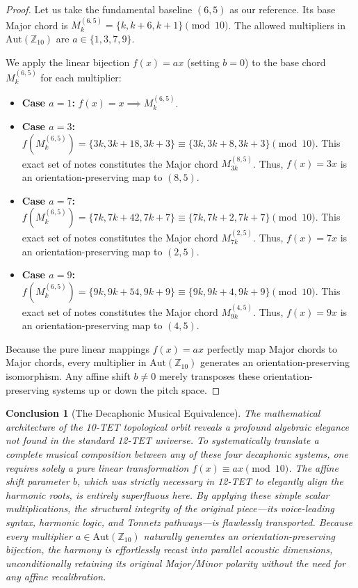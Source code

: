 \documentclass[11pt,letterpaper]{amsart}
\newcommand{\Z}{\mathbb{Z}}
\newtheorem{conclusion}{Conclusion}
\begin{document}
\begin{proof}
Let us take the fundamental baseline $(6,5)$ as our reference. Its base Major chord is $M_k^{(6,5)} = \{k, k+6, k+1\} \pmod{10}$. The allowed multipliers in $\mathrm{Aut}(\Z_{10})$ are $a \in \{1, 3, 7, 9\}$. 

We apply the linear bijection $f(x) = ax$ (setting $b=0$) to the base chord $M_k^{(6,5)}$ for each multiplier:
\begin{itemize}
    \item \textbf{Case $a = 1$:} $f(x) = x \implies M_k^{(6,5)}$.
    \item \textbf{Case $a = 3$:} $f(M_k^{(6,5)}) = \{3k, 3k+18, 3k+3\} \equiv \{3k, 3k+8, 3k+3\} \pmod{10}$. This exact set of notes constitutes the Major chord $M_{3k}^{(8,5)}$. Thus, $f(x)=3x$ is an orientation-preserving map to $(8,5)$.
    \item \textbf{Case $a = 7$:} $f(M_k^{(6,5)}) = \{7k, 7k+42, 7k+7\} \equiv \{7k, 7k+2, 7k+7\} \pmod{10}$. This exact set of notes constitutes the Major chord $M_{7k}^{(2,5)}$. Thus, $f(x)=7x$ is an orientation-preserving map to $(2,5)$.
    \item \textbf{Case $a = 9$:} $f(M_k^{(6,5)}) = \{9k, 9k+54, 9k+9\} \equiv \{9k, 9k+4, 9k+9\} \pmod{10}$. This exact set of notes constitutes the Major chord $M_{9k}^{(4,5)}$. Thus, $f(x)=9x$ is an orientation-preserving map to $(4,5)$.
\end{itemize}
Because the pure linear mappings $f(x) = ax$ perfectly map Major chords to Major chords, every multiplier in $\mathrm{Aut}(\Z_{10})$ generates an orientation-preserving isomorphism. Any affine shift $b \neq 0$ merely transposes these orientation-preserving systems up or down the pitch space.
\end{proof}

\begin{conclusion}[The Decaphonic Musical Equivalence]
The mathematical architecture of the 10-TET topological orbit reveals a profound algebraic elegance not found in the standard 12-TET universe. To systematically translate a complete musical composition between any of these four decaphonic systems, one requires solely a pure linear transformation $f(x) \equiv ax \pmod{10}$. The affine shift parameter $b$, which was strictly necessary in 12-TET to elegantly align the harmonic roots, is entirely superfluous here. By applying these simple scalar multiplications, the structural integrity of the original piece---its voice-leading syntax, harmonic logic, and Tonnetz pathways---is flawlessly transported. Because every multiplier $a \in \mathrm{Aut}(\Z_{10})$ naturally generates an orientation-preserving bijection, the harmony is effortlessly recast into parallel acoustic dimensions, unconditionally retaining its original Major/Minor polarity without the need for any affine recalibration.
\end{conclusion}
\end{document}
